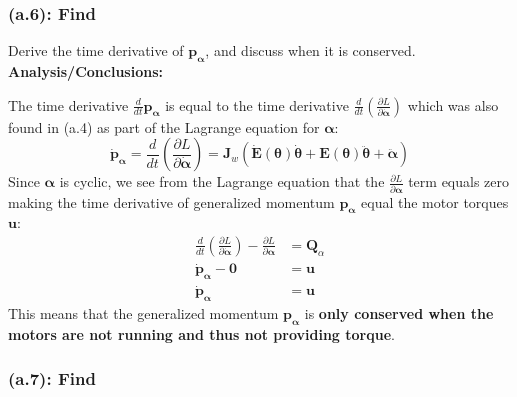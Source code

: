 \documentclass[titlepage]{article}
\begin{document}
\newpage

\subsubsection*{(a.6): Find}

Derive the time derivative of $\boldsymbol{p}_{\boldsymbol{\alpha}}$, and discuss when it is conserved.\\

\textbf{Analysis/Conclusions:}\\

\begin{mdframed}[linewidth=1pt, innertopmargin=10pt, innerbottommargin=10pt]
	The time derivative $\frac{d}{dt}\boldsymbol{p}_{\boldsymbol{\alpha}}$ is equal to the time derivative $\frac{d}{dt}(\frac{\partial L}{\partial\dot{\boldsymbol{\alpha}}})$ which was also found in (a.4) as part of the Lagrange equation for $\boldsymbol{\alpha}$:
	\begin{equation}
		\dot{\boldsymbol{p}}_{\boldsymbol{\alpha}}=\frac{d}{dt}\left(\frac{\partial L}{\partial\dot{\boldsymbol{\alpha}}}\right)=\boldsymbol{J}_w\left(\dot{\boldsymbol{E}}(\boldsymbol{\theta})\dot{\boldsymbol{\theta}}+\boldsymbol{E}(\boldsymbol{\theta})\ddot{\boldsymbol{\theta}}+\ddot{\boldsymbol{\alpha}}\right)
	\end{equation}
	Since $\boldsymbol{\alpha}$ is cyclic, we see from the Lagrange equation that the $\frac{\partial L}{\partial\boldsymbol{\alpha}}$ term equals zero making the time derivative of generalized momentum $\boldsymbol{p}_{\boldsymbol{\alpha}}$ equal the motor torques $\boldsymbol{u}$: 
		\begin{equation}
		\begin{split}
			\frac{d}{dt}\left(\frac{\partial L}{\partial\dot{\boldsymbol{\alpha}}}\right)-\frac{\partial L}{\partial\boldsymbol{\alpha}}&=\boldsymbol{Q}_\alpha \\
			\dot{\boldsymbol{p}}_{\boldsymbol{\alpha}}-\boldsymbol{0}&=\boldsymbol{u} \\
			\dot{\boldsymbol{p}}_{\boldsymbol{\alpha}}&=\boldsymbol{u}
		\end{split}
	\end{equation}
	This means that the generalized momentum $\boldsymbol{p}_{\boldsymbol{\alpha}}$ is \textbf{only conserved when the motors are not running and thus not providing torque}.
\end{mdframed}

\subsubsection*{(a.7): Find}
\end{document}
